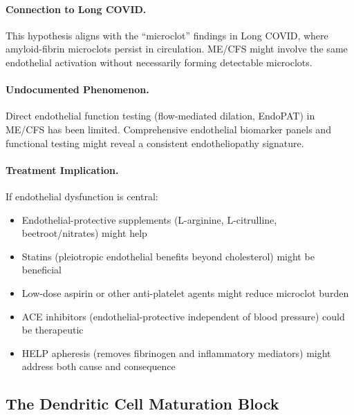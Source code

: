 \paragraph{Connection to Long COVID.} This hypothesis aligns with the ``microclot'' findings in Long COVID, where amyloid-fibrin microclots persist in circulation. ME/CFS might involve the same endothelial activation without necessarily forming detectable microclots.

\paragraph{Undocumented Phenomenon.} Direct endothelial function testing (flow-mediated dilation, EndoPAT) in ME/CFS has been limited. Comprehensive endothelial biomarker panels and functional testing might reveal a consistent endotheliopathy signature.

\paragraph{Treatment Implication.} If endothelial dysfunction is central:
\begin{itemize}
    \item Endothelial-protective supplements (L-arginine, L-citrulline, beetroot/nitrates) might help
    \item Statins (pleiotropic endothelial benefits beyond cholesterol) might be beneficial
    \item Low-dose aspirin or other anti-platelet agents might reduce microclot burden
    \item ACE inhibitors (endothelial-protective independent of blood pressure) could be therapeutic
    \item HELP apheresis (removes fibrinogen and inflammatory mediators) might address both cause and consequence
\end{itemize}

\subsection{The Dendritic Cell Maturation Block}

